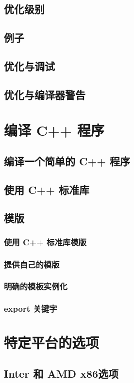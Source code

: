 \documentclass[lang=cn,12pt,newtx,scheme=chinese]{elegantbook}
\begin{document}
\section{优化级别}
\section{例子}
\section{优化与调试}
\section{优化与编译器警告}

\chapter{编译 C++ 程序}
\section{编译一个简单的 C++ 程序}
\section{使用 C++ 标准库}
\section{模版}
\subsection{使用 C++ 标准库模版}
\subsection{提供自己的模版}
\subsection{明确的模板实例化}
\subsection{export 关键字}

\chapter{特定平台的选项}
\section{Inter 和 AMD x86选项}
\end{document}
